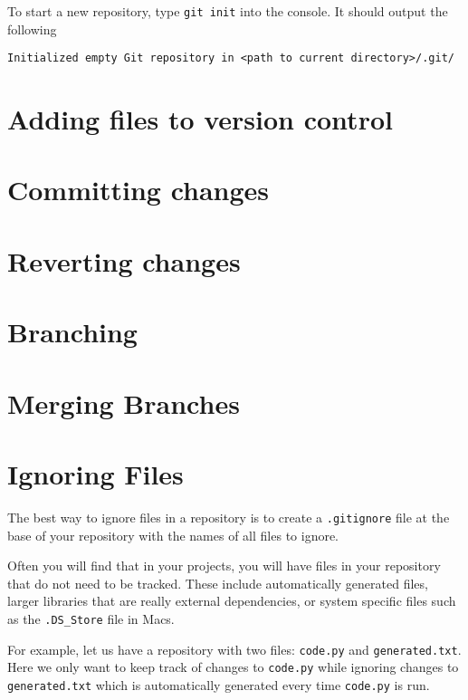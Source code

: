 \documentclass{amsart}
\begin{document}
To start a new repository, type \verb|git init| into the console. It should output the following

\begin{verbatim}
Initialized empty Git repository in <path to current directory>/.git/
\end{verbatim}


\newpage

\section*{Adding files to version control}

\section*{Committing changes}

\section*{Reverting changes}

\section*{Branching}

\section*{Merging Branches}

\newpage
\section*{Ignoring Files}

The best way to ignore files in a repository is to create a \texttt{.gitignore} file at the base of your repository with the names of all files to ignore.

Often you will find that in your projects, you will have files in your repository that do not need to be tracked.  These include automatically generated files, larger libraries that are really external dependencies, or system specific files such as the \texttt{.DS\_Store} file in Macs.

For example, let us have a repository with two files: \texttt{code.py} and \texttt{generated.txt}.  Here we only want to keep track of changes to \texttt{code.py} while ignoring changes to \texttt{generated.txt} which is automatically generated every time \texttt{code.py} is run.
\end{document}
